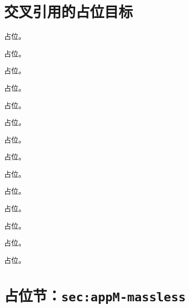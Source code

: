 \section{交叉引用的占位目标}
\begin{proposition}\label{prop:front-positivity-large-scale}占位。\end{proposition}
\begin{conjecture}\label{conj:pdf-positivity}占位。\end{conjecture}
\begin{theorem}\label{thm:dis-moments}占位。\end{theorem}
\begin{theorem}\label{thm:dis-ope}占位。\end{theorem}
\begin{assumption}\label{asm:appM-brst-ope}占位。\end{assumption}
\begin{assumption}\label{asm:appM-forward}占位。\end{assumption}
\begin{theorem}\label{thm:dis-fixed-n}占位。\end{theorem}
\begin{theorem}\label{thm:dis-moments-np}占位。\end{theorem}
\begin{example}\label{ex:appM-nonadditive}占位。\end{example}
\begin{proposition}\label{prop:dis-ope-euclid}占位。\end{proposition}
\begin{definition}\label{def:method-collins-conditions}占位。\end{definition}
\begin{proposition}\label{prop:appN-triangle-exact}占位。\end{proposition}
\begin{lemma}\label{lem:method-pairing}占位。\end{lemma}
\begin{lemma}\label{lem:method-meets}占位。\end{lemma}
\section{占位节：\texttt{sec:appM-massless}}\label{sec:appM-massless}
\begin{center}\label{fig:method-hasse}\end{center}
